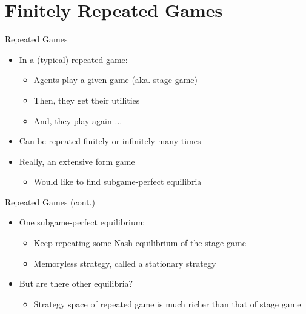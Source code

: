 \documentclass[11pt,aspectratio=169]{beamer}
\subtitle{\vspace{2.1em}Lecture 6: Repeated Games}
\begin{document}
 \begin{frame}[plain]
  \titlepage
 \end{frame}
 
 
 \section{Finitely Repeated Games}
  \begin{frame}{Repeated Games}
   \begin{itemize}[<+->]
   \setlength{\itemsep}{1.2em}
    \item In a (typical) repeated game:
    \begin{itemize}[<.->]
     \item Agents play a given game (aka. \alert{stage game})
     \item Then, they get their utilities
     \item And, they play again $\dots$
    \end{itemize}
    \item Can be repeated \alert{finitely} or \alert{infinitely} many times
    \item Really, an extensive form game
    \begin{itemize}[<.->]
    \item Would like to find subgame-perfect equilibria
    \end{itemize}
   \end{itemize}
  \end{frame}
  
  
  \begin{frame}{Repeated Games (cont.)}
   \begin{itemize}[<+->]
   \setlength{\itemsep}{1.2em}
    \item One subgame-perfect equilibrium:
    \begin{itemize}[<.->]
     \item Keep repeating some Nash equilibrium of the stage game 
     \item \alert{Memoryless} strategy, called a \alert{stationary strategy}
    \end{itemize}
    \item But are there other equilibria?
    \begin{itemize}[<.->]
     \item Strategy space of repeated game is much richer than that of stage game
    \end{itemize}
   \end{itemize}
  \end{frame}
\end{document}
